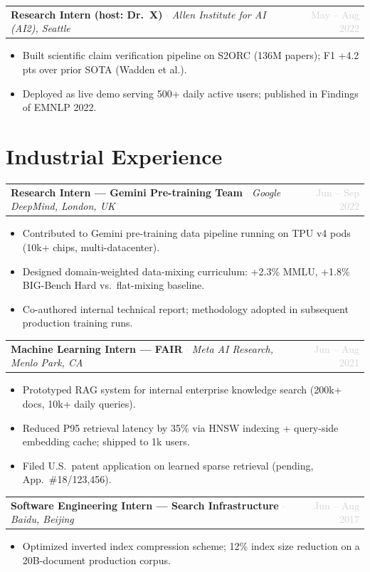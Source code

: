 \documentclass[10pt, letterpaper]{article}
\makeatletter
\newcommand{\entry}[3]{%
  \begin{tabularx}{\linewidth}{@{}X r@{}}
    \textbf{#1} \textcolor{lightgray}{$\cdot$} \textit{#2} &
    {\small\textcolor{lightgray}{#3}}
  \end{tabularx}\vspace{1pt}%
}
\makeatother
\begin{document}
\entry{Research Intern (host: Dr.\ X)}{Allen Institute for AI (AI2), Seattle}{May -- Aug 2022}
\begin{itemize}
  \item Built scientific claim verification pipeline on S2ORC (136M papers); F1 +4.2 pts over prior SOTA (Wadden et al.).
  \item Deployed as live demo serving 500+ daily active users; published in Findings of EMNLP 2022.
\end{itemize}

\section{Industrial Experience}

\entry{Research Intern --- Gemini Pre-training Team}{Google DeepMind, London, UK}{Jun -- Sep 2022}
\begin{itemize}
  \item Contributed to Gemini pre-training data pipeline running on TPU v4 pods (10k+ chips, multi-datacenter).
  \item Designed domain-weighted data-mixing curriculum: +2.3\% MMLU, +1.8\% BIG-Bench Hard vs.\ flat-mixing baseline.
  \item Co-authored internal technical report; methodology adopted in subsequent production training runs.
\end{itemize}
\vspace{3pt}

\entry{Machine Learning Intern --- FAIR}{Meta AI Research, Menlo Park, CA}{Jun -- Aug 2021}
\begin{itemize}
  \item Prototyped RAG system for internal enterprise knowledge search (200k+ docs, 10k+ daily queries).
  \item Reduced P95 retrieval latency by 35\% via HNSW indexing + query-side embedding cache; shipped to 1k users.
  \item Filed U.S.\ patent application on learned sparse retrieval (pending, App.\ \#18/123,456).
\end{itemize}
\vspace{3pt}

\entry{Software Engineering Intern --- Search Infrastructure}{Baidu, Beijing}{Jun -- Aug 2017}
\begin{itemize}
  \item Optimized inverted index compression scheme; 12\% index size reduction on a 20B-document production corpus.
\end{itemize}
\end{document}
